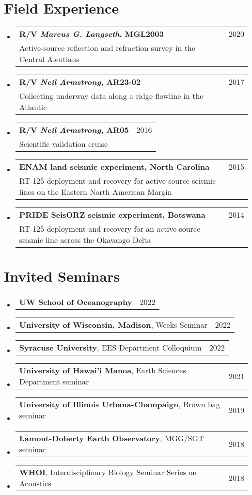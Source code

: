 \documentclass[letterpaper,11pt]{article}
\makeatletter
\newcommand{\resumeField}[3]{
  \vspace{-2pt}\item
    \begin{tabular*}{0.97\textwidth}[t]{l@{\extracolsep{\fill}}r}
      \textbf{#1} & #2 \\
      \small#3\\
    \end{tabular*}\vspace{-7pt}
}
\newcommand{\resumeSmallThing}[3]{
  \vspace{-2pt}\item
    \begin{tabular*}{0.97\textwidth}[t]{l@{\extracolsep{\fill}}r}
      \textbf{#1}, {#2} & #3\\
    \end{tabular*}\vspace{-14pt}
}
\newcommand{\resumeSmallerThing}[2]{
  \vspace{-2pt}\item
    \begin{tabular*}{0.97\textwidth}[t]{l@{\extracolsep{\fill}}r}
      \textbf{#1} & #2\\
    \end{tabular*}\vspace{-14pt}
}
\newcommand{\resumeSubHeadingListStart}{\begin{itemize}[leftmargin=0.15in, label={}]}
\newcommand{\resumeSubHeadingListEnd}{\end{itemize}}
\makeatother
\begin{document}
\section{Field Experience}
    \resumeSubHeadingListStart
    \resumeField
      {R/V \textit{Marcus G. Langseth}, MGL2003}{2020}
      {Active-source reflection and refraction survey in the Central Aleutians}
    \resumeField
      {R/V \textit{Neil Armstrong}, AR23-02}{2017}
      {Collecting underway data along a ridge flowline in the Atlantic}
    \resumeField
      {R/V \textit{Neil Armstrong}, AR05}{2016}
      {Scientific validation cruise}
    \resumeField
      {ENAM land seismic experiment, North Carolina}{2015}
      {RT-125 deployment and recovery for active-source seismic lines on the Eastern North American Margin}
    \resumeField
      {PRIDE SeisORZ seismic experiment, Botswana}{2014}
      {RT-125 deployment and recovery for an active-source seismic line across the Okavango Delta}
    \resumeSubHeadingListEnd


\section{Invited Seminars}
    \resumeSubHeadingListStart
    \resumeSmallerThing
      {UW School of Oceanography}{2022}
    \resumeSmallThing
      {University of Wisconsin, Madison}{Weeks Seminar}{2022}
    \resumeSmallThing
      {Syracuse University}{EES Department Colloquium}{2022}
    \resumeSmallThing
      {University of Hawai'i Manoa}{Earth Sciences Department seminar}{2021}
    \resumeSmallThing
      {University of Illinois Urbana-Champaign}{Brown bag seminar}{2019}
    \resumeSmallThing
      {Lamont-Doherty Earth Observatory}{MGG/SGT seminar}{2018}
    \resumeSmallThing
      {WHOI}{Interdisciplinary Biology Seminar Series on Acoustics}{2018}
    \resumeSubHeadingListEnd


\end{document}
